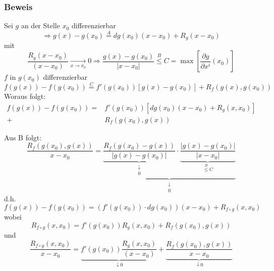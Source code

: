 \subsubsection*{Beweis}
Sei $g$ an der Stelle $x_0$ differenzierbar
\[ \Rightarrow g\left( x \right) - g\left( {{x_0}} \right)\mathop  = \limits^A dg\left( {{x_0}} \right)\left( {x - {x_0}} \right) + {R_g}\left( {x - {x_0}} \right)\]
mit \[\frac{{{R_g}\left( {x - {x_0}} \right)}}{{\left( {x - {x_0}} \right)}}\mathop  \to \limits_{x \to {x_0}} 0 \Rightarrow \frac{{g\left( x \right) - g\left( {{x_0}} \right)}}{{\left| {x - {x_0}} \right|}}\mathop  \le \limits^B C = \max \left[ {\frac{{\partial g}}{{\partial {x^i}}}\left( {{x_0}} \right)} \right]\] $f$ in $g\left( x_0\right)$ differenzierbar
\[f\left( {g\left( x \right)} \right) - f\left( {g\left( {{x_0}} \right)} \right)\mathop  = \limits^C f'\left( {g\left( {{x_0}} \right)} \right)\left[ {g(x) - g\left( {{x_0}} \right)} \right] + {R_f}\left( {g\left( x \right),g\left( {{x_0}} \right)} \right)\]
Woraus folgt:
\begin{align*}
f\left( {g\left( x \right)} \right) - f\left( {g\left( {{x_0}} \right)} \right) = & f'\left( {g\left( {{x_0}} \right)} \right)\left[ {dg\left( {{x_0}} \right)\left( {x - {x_0}} \right) + {R_g}\left( {x,{x_0}} \right)} \right]\\ + & {R_f}\left( {g\left( {{x_0}} \right),g\left( x \right)} \right)
\end{align*}

Aus B folgt:
\[\frac{{{R_f}\left( {g\left( {{x_0}} \right),g\left( x \right)} \right)}}{{x - {x_0}}} = \underbrace {\underbrace {\frac{{{R_f}\left( {g\left( {{x_0}} \right) - g\left( x \right)} \right)}}{{\left| {g\left( x \right) - g\left( {{x_0}} \right)} \right|}}}_{\begin{array}{*{20}{c}}
 \downarrow \\
0
\end{array}} \cdot \underbrace {\frac{{\left| {g\left( x \right) - g\left( {{x_0}} \right)} \right|}}{{\left| {x - {x_0}} \right|}}}_{\mathop  \le \limits^B C}}_{\begin{array}{*{20}{c}}
 \downarrow \\
0
\end{array}}\]
d.h.
\[f\left( {g\left( x \right)} \right) - f\left( {g\left( {{x_0}} \right)} \right) = \left( {f'\left( {g\left( {{x_0}} \right)} \right) \cdot dg\left( {{x_0}} \right)} \right)\left( {x - {x_0}} \right) + {R_{f \circ g}}\left( {x,{x_0}} \right)\]
wobei
\[{R_{f \circ g}}\left( {x,{x_0}} \right) = f'\left( {g\left( {{x_0}} \right)} \right){R_g}\left( {x,{x_0}} \right) + {R_f}\left( {g\left( {{x_0}} \right),g\left( x \right)} \right)\]
und
\[\frac{{{R_{f \circ g}}\left( {x,{x_0}} \right)}}{{x - {x_0}}} = \underbrace {f'\left( {g\left( {{x_0}} \right)} \right)\frac{{{R_g}\left( {x,{x_0}} \right)}}{{\left( {x - {x_0}} \right)}}}_{ \downarrow 0} + \underbrace {\frac{{{R_f}\left( {g\left( {{x_0}} \right),g\left( x \right)} \right)}}{{x - {x_0}}}}_{ \downarrow 0}\]

